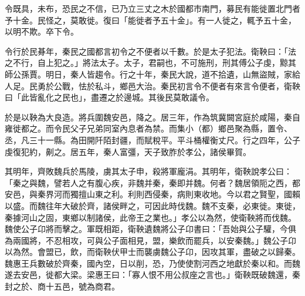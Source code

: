 \begin{pinyinscope}
令既具，未布，恐民之不信，已乃立三丈之木於國都市南門，募民有能徙置北門者予十金。民怪之，莫敢徙。復曰「能徙者予五十金」。有一人徙之，輒予五十金，以明不欺。卒下令。

令行於民朞年，秦民之國都言初令之不便者以千數。於是太子犯法。衛鞅曰：「法之不行，自上犯之。」將法太子。太子，君嗣也，不可施刑，刑其傅公子虔，黥其師公孫賈。明日，秦人皆趨令。行之十年，秦民大說，道不拾遺，山無盜賊，家給人足。民勇於公戰，怯於私斗，鄉邑大治。秦民初言令不便者有來言令便者，衛鞅曰「此皆亂化之民也」，盡遷之於邊城。其後民莫敢議令。

於是以鞅為大良造。將兵圍魏安邑，降之。居三年，作為筑冀闕宮庭於咸陽，秦自雍徙都之。而令民父子兄弟同室內息者為禁。而集小（都）鄉邑聚為縣，置令、丞，凡三十一縣。為田開阡陌封疆，而賦稅平。平斗桶權衡丈尺。行之四年，公子虔復犯約，劓之。居五年，秦人富彊，天子致胙於孝公，諸侯畢賀。

其明年，齊敗魏兵於馬陵，虜其太子申，殺將軍龐涓。其明年，衛鞅說孝公曰：「秦之與魏，譬若人之有腹心疾，非魏并秦，秦即并魏。何者？魏居領阨之西，都安邑，與秦界河而獨擅山東之利。利則西侵秦，病則東收地。今以君之賢聖，國賴以盛。而魏往年大破於齊，諸侯畔之，可因此時伐魏。魏不支秦，必東徙。東徙，秦據河山之固，東鄉以制諸侯，此帝王之業也。」孝公以為然，使衛鞅將而伐魏。魏使公子卬將而擊之。軍既相距，衛鞅遺魏將公子卬書曰：「吾始與公子驩，今俱為兩國將，不忍相攻，可與公子面相見，盟，樂飲而罷兵，以安秦魏。」魏公子卬以為然。會盟已，飲，而衛鞅伏甲士而襲虜魏公子卬，因攻其軍，盡破之以歸秦。魏惠王兵數破於齊秦，國內空，日以削，恐，乃使使割河西之地獻於秦以和。而魏遂去安邑，徙都大梁。梁惠王曰：「寡人恨不用公叔座之言也。」衛鞅既破魏還，秦封之於、商十五邑，號為商君。


\end{pinyinscope}
